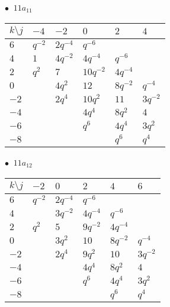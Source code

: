 \begin{minipage}{\linewidth}
$\bullet\ $ $11a_{11}$ \vspace{0.5em} \\
\begin{tabular}{l|lllll}
$k \setminus j$ & $-4$ & $-2$ & $0$ & $2$ & $4$ \\
\hline
$6$ & $q^{-2}$ & $2q^{-4}$ & $q^{-6}$ &  &  \\
$4$ & $1$ & $4q^{-2}$ & $4q^{-4}$ & $q^{-6}$ &  \\
$2$ & $q^{2}$ & $7$ & $10q^{-2}$ & $4q^{-4}$ &  \\
$0$ &  & $4q^{2}$ & $12$ & $8q^{-2}$ & $q^{-4}$ \\
$-2$ &  & $2q^{4}$ & $10q^{2}$ & $11$ & $3q^{-2}$ \\
$-4$ &  &  & $4q^{4}$ & $8q^{2}$ & $4$ \\
$-6$ &  &  & $q^{6}$ & $4q^{4}$ & $3q^{2}$ \\
$-8$ &  &  &  & $q^{6}$ & $q^{4}$ \\
\end{tabular}
\vspace{2em}
\end{minipage}
%
\begin{minipage}{\linewidth}
$\bullet\ $ $11a_{12}$ \vspace{0.5em} \\
\begin{tabular}{l|lllll}
$k \setminus j$ & $-2$ & $0$ & $2$ & $4$ & $6$ \\
\hline
$6$ & $q^{-2}$ & $2q^{-4}$ & $q^{-6}$ &  &  \\
$4$ &  & $3q^{-2}$ & $4q^{-4}$ & $q^{-6}$ &  \\
$2$ & $q^{2}$ & $5$ & $9q^{-2}$ & $4q^{-4}$ &  \\
$0$ &  & $3q^{2}$ & $10$ & $8q^{-2}$ & $q^{-4}$ \\
$-2$ &  & $2q^{4}$ & $9q^{2}$ & $10$ & $3q^{-2}$ \\
$-4$ &  &  & $4q^{4}$ & $8q^{2}$ & $4$ \\
$-6$ &  &  & $q^{6}$ & $4q^{4}$ & $3q^{2}$ \\
$-8$ &  &  &  & $q^{6}$ & $q^{4}$ \\
\end{tabular}
\vspace{2em}
\end{minipage}
%
